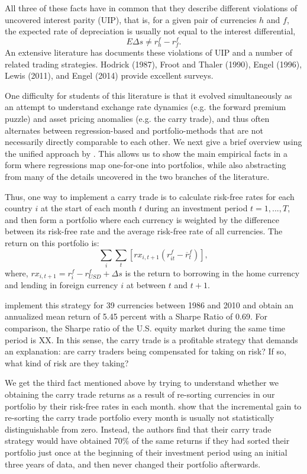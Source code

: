 All three of these facts have in common that they describe different violations of uncovered interest parity (UIP), that is, for a given pair of currencies $h$ and $f$, the expected rate of depreciation is usually not equal to the interest differential, $$E\Delta s \neq r^f_h-r^f_f .$$ An extensive literature has documents these violations of UIP and a number of related trading strategies. Hodrick (1987), Froot and Thaler (1990), Engel (1996), Lewis (2011), and Engel (2014) provide excellent surveys. 

One difficulty for students of this literature is that it evolved simultaneously as an attempt to understand exchange rate dynamics (e.g. the forward premium puzzle) and asset pricing anomalies (e.g. the carry trade), and thus often alternates between regression-based and portfolio-methods that are not necessarily directly comparable to each other. We next give a brief overview using the unified approach by \citet{HassanMano2015}. This allows us to show the main empirical facts in a form where regressions map one-for-one into portfolios, while also abstracting from many of the details uncovered in the two branches of the literature.

Thus, one way to implement a carry trade is to calculate risk-free 
rates for each country $i$ at the start of each month $t$ during an 
investment period $t = 1, ..., T$, and then form a portfolio where 
each currency is weighted by the difference between its risk-free rate 
and the average risk-free rate of all currencies. The return on this 
portfolio is:
\begin{equation}
  \label{eq_carry}
  \textstyle\sum_{i}\sum_t\left[ rx_{i,t+1}\left( r^f_{it}-\overline{r}^f_{t}\right) \right] ,
\end{equation}%
where, $rx_{i,t+1}=r^f_i-r^f_{USD}+\Delta s$ is the return to 
borrowing in the home currency and lending in foreign currency $i$ at
between $t$ and $t+1$.

\citet{HassanMano2015} implement this strategy for 39 currencies between 
1986 and 2010 and obtain an annualized mean return of 5.45 percent with 
a Sharpe Ratio of 0.69. For comparison, the Sharpe ratio of the U.S. 
equity market during the same time period is XX. In this sense, the carry 
trade is a profitable strategy that demands an explanation: are carry 
traders being compensated for taking on risk? If so, what kind of 
risk are they taking?

We get the third fact mentioned above by trying to understand whether we
obtaining the carry trade returns as a result of re-sorting currencies in 
our portfolio by their risk-free rates in each month. 
\citet{HassanMano2015} show that the incremental gain to re-sorting the 
carry trade portfolio every month is usually not statistically 
distinguishable from zero. Instead, the authors find that their carry 
trade strategy would have obtained 70\% of the same returns if they had 
sorted their portfolio just once at the beginning of their investment 
period using an initial three years of data, and then never changed their
portfolio afterwards.


